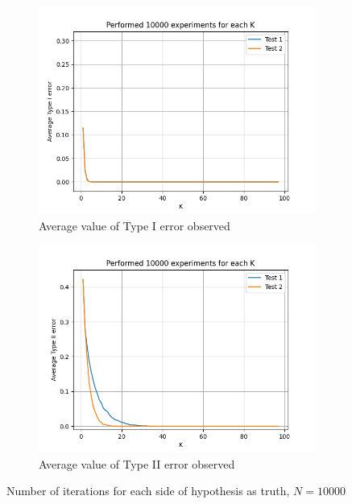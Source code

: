 \documentclass[fleqn, 11pt]{article}
\begin{document}
\newpage
\begin{figure}[H]
    \centering
    \begin{subfigure}[H]{0.49\textwidth}
        \centering
        \includegraphics[width=\textwidth]{P3/type1_10000.png}
        \caption[]{Average value of Type I error observed}
    \end{subfigure}
    \begin{subfigure}[H]{0.49\textwidth}
        \centering
        \includegraphics[width=\textwidth]{P3/type2_10000.png}
        \caption[]{Average value of Type II error observed}
    \end{subfigure}
    \caption{Number of iterations for each side of hypothesis as truth, $N = 10000$}
\end{figure}
\end{document}
